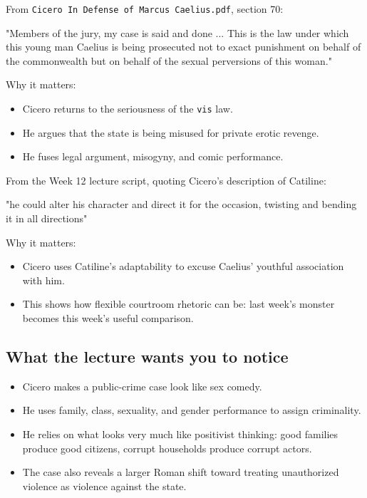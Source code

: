 \documentclass[11pt]{article}
\begin{document}
From \texttt{Cicero In Defense of Marcus Caelius.pdf}, section 70:

\begin{quotebox}
"Members of the jury, my case is said and done ... This is the law under which this young man Caelius is being prosecuted not to exact punishment on behalf of the commonwealth but on behalf of the sexual perversions of this woman."
\end{quotebox}

Why it matters:

\begin{itemize}
\item Cicero returns to the seriousness of the \texttt{vis} law.
\item He argues that the state is being misused for private erotic revenge.
\item He fuses legal argument, misogyny, and comic performance.
\end{itemize}

From the Week 12 lecture script, quoting Cicero's description of Catiline:

\begin{quotebox}
"he could alter his character and direct it for the occasion, twisting and bending it in all directions"
\end{quotebox}

Why it matters:

\begin{itemize}
\item Cicero uses Catiline's adaptability to excuse Caelius' youthful association with him.
\item This shows how flexible courtroom rhetoric can be: last week's monster becomes this week's useful comparison.
\end{itemize}

\subsection{What the lecture wants you to notice}

\begin{itemize}
\item Cicero makes a public-crime case look like sex comedy.
\item He uses family, class, sexuality, and gender performance to assign criminality.
\item He relies on what looks very much like positivist thinking: good families produce good citizens, corrupt households produce corrupt actors.
\item The case also reveals a larger Roman shift toward treating unauthorized violence as violence against the state.
\end{itemize}
\end{document}
